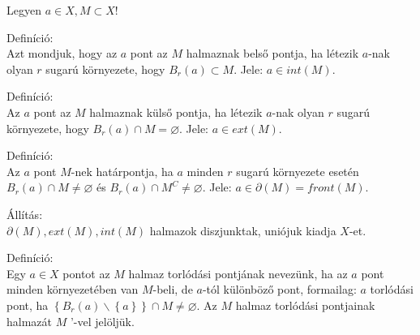\documentclass[]{scrartcl}
\newenvironment{definicio}{}{}
\newenvironment{allitas}{}{}
\begin{document}
Legyen \(a \in X,M \subset X\)!

\begin{definicio}

Definíció:\\
Azt mondjuk, hogy az \(a\) pont az \(M\) halmaznak belső pontja, ha
létezik \(a\)-nak olyan \(r\) sugarú környezete, hogy
\(B_{r}\left( a \right) \subset M\). Jele:
\({a \in {int}\left( M \right)}.\)

\end{definicio}

\begin{definicio}

Definíció:\\
Az \(a\) pont az \(M\) halmaznak külső pontja, ha létezik \(a\)-nak
olyan \(r\) sugarú környezete, hogy
\(B_{r}\left( a \right) \cap M = \varnothing\). Jele:
\({a \in {ext}\left( M \right)}.\)

\end{definicio}

\begin{definicio}

Definíció:\\
Az \(a\) pont \(M\)-nek határpontja, ha \(a\) minden \(r\) sugarú
környezete esetén \(B_{r}\left( a \right) \cap M \neq \varnothing\) és
\(B_{r}\left( a \right) \cap M^{C} \neq \varnothing\). Jele:
\({a \in \partial\left( M \right) = {front}\left( M \right)}.\)

\end{definicio}

\begin{allitas}

Állítás:\\
\(\partial\left( M \right),{ext}\left( M \right),{int}\left( M \right)\)
halmazok diszjunktak, uniójuk kiadja \(X\)-et.

\end{allitas}

\begin{definicio}

Definíció:\\
Egy \(a \in X\) pontot az \(M\) halmaz torlódási pontjának nevezünk, ha
az \(a\) pont minden környezetében van \(M\)-beli, de \(a\)-tól
különböző pont, formailag: \(a\) torlódási pont, ha
\(\left\{ {B_{r}\left( a \right)\backslash\left\{ a \right\}} \right\} \cap M \neq \varnothing\).
Az \(M\) halmaz torlódási pontjainak halmazát \(M\) '-vel jelöljük.

\end{definicio}
\end{document}
